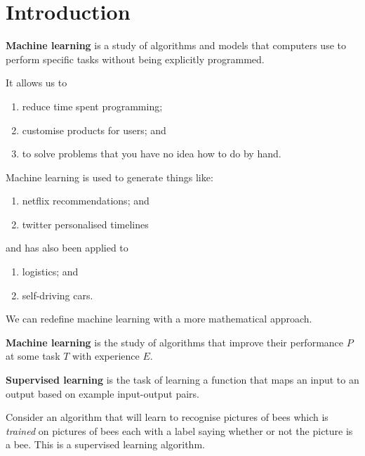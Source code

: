 \chapter{Introduction}

\begin{definition}
    \textbf{Machine learning} is a study of algorithms and models
    that computers use to perform specific tasks without being explicitly programmed.
\end{definition}
It allows us to
\begin{enumerate}
    \item reduce time spent programming;
    \item customise products for users; and
    \item to solve problems that you have no idea how to do by hand.
\end{enumerate}

\begin{example}
    Machine learning is used to generate things like:
    \begin{enumerate}
        \item netflix recommendations; and
        \item twitter personalised timelines
    \end{enumerate}
    and has also been applied to
    \begin{enumerate}
        \item logistics; and
        \item self-driving cars.
    \end{enumerate}
\end{example}

We can redefine machine learning with a more mathematical approach.

\begin{definition}
    \textbf{Machine learning} is the study of algorithms
    that improve their performance $P$ at some task $T$ with experience $E$.
\end{definition}

\begin{definition}
    \textbf{Supervised learning} is the task of learning a function
    that maps an input to an output based on example input-output pairs.
\end{definition}

\begin{example}
    Consider an algorithm that will learn to recognise pictures of bees
    which is \emph{trained} on pictures of bees each with a label
    saying whether or not the picture is a bee.
    This is a supervised learning algorithm.
\end{example}


